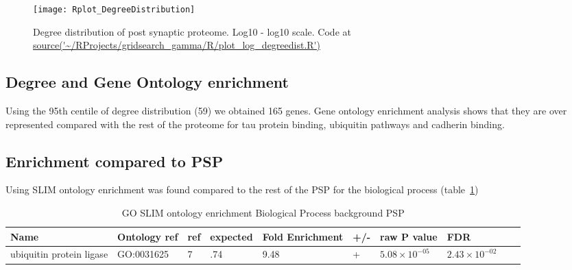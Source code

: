 \begin{figure}
    \texttt{[image: Rplot\_DegreeDistribution]}
    \caption{Degree distribution of post synaptic proteome. Log10 - log10 scale. Code at \url{source('~/RProjects/gridsearch_gamma/R/plot_log_degreedist.R') }}
    \label{fig:Degree distribution of post synaptic proteome. Log10 - log10 scale.}
\end{figure}

\subsection{Degree and Gene Ontology enrichment}

Using the 95th centile of degree distribution (59) we obtained 165 genes. Gene ontology enrichment analysis shows that they are over represented compared with the rest of the proteome for tau protein binding, ubiquitin pathways and cadherin binding.

\subsection{Enrichment compared to PSP}

Using SLIM ontology enrichment was found compared to the rest of the PSP for the biological process (table~\ref{tab:GO SLIM ontology enrichment Biological Process background PSP})

\begin{table}
\centering
\begin{adjustbox}{max width=\textwidth}
\begin{tabular}{llllllllll}
Name & Ontology ref &ref &	expected &	Fold Enrichment &	+/-	&raw P value&FDR\\
\hline
ubiquitin protein ligase & GO:0031625&  	7 &  	.74 & 	9.48 &  	+ & 	$5.08\times 10^{-05}$ & 	$2.43 \times 10^{-02}$\\
\end{tabular}
\end{adjustbox}
\caption{GO SLIM ontology enrichment Biological Process background PSP}
\label{tab:GO SLIM ontology enrichment Biological Process background PSP}
\end{table}



